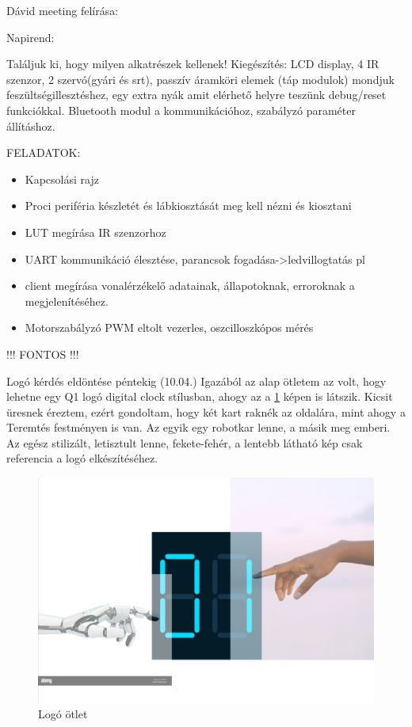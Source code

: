 \documentclass{article}
\begin{document}
Dávid meeting felírása:

\vspace{5mm} %

Napirend:

Találjuk ki, hogy milyen alkatrészek kellenek!
Kiegészítés: LCD display, 4 IR szenzor, 2 szervó(gyári és srt), passzív áramköri elemek (táp modulok) mondjuk feszültségillesztéshez, egy extra nyák amit elérhető helyre teszünk debug/reset funkciókkal. Bluetooth modul a kommunikációhoz, szabályzó paraméter állításhoz.

\vspace{5mm} %

FELADATOK:
\begin{itemize}
\item Kapcsolási rajz
\item Proci periféria készletét és lábkiosztását meg kell nézni és kiosztani
\item LUT megírása IR szenzorhoz
\item UART kommunikáció élesztése, parancsok fogadása->ledvillogtatás pl
\item client megírása vonalérzékelő adatainak, állapotoknak, erroroknak a megjelenítéséhez.
\item Motorszabályzó PWM eltolt vezerles, oszcilloszkópos mérés
\end{itemize}

!!! FONTOS !!!

\vspace{5mm} %

Logó kérdés eldöntése péntekig (10.04.)
Igazából az alap ötletem az volt, hogy lehetne egy Q1 logó digital clock stílusban, ahogy az a \ref{fig:logo_v0} képen is látszik. Kicsit üresnek éreztem, ezért gondoltam, hogy két kart raknék az oldalára, mint ahogy a Teremtés festményen is van. Az egyik egy robotkar lenne, a másik meg emberi. Az egész stilizált, letisztult lenne, fekete-fehér, a lentebb látható kép csak referencia a logó elkészítéséhez.

\newpage
\begin{figure}
      \centering
      \includegraphics[width=0.5\linewidth]{logo_v0.png}
      \caption{\label{fig:logo_v0}Logó ötlet}
      \end{figure}
\end{document}
